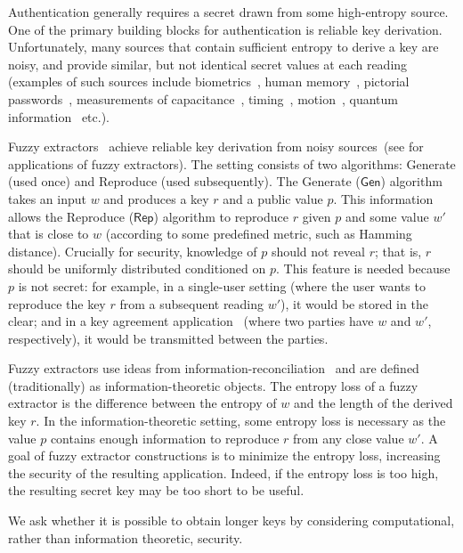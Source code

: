 \documentclass{llncs}
\newcommand{\class}[1]{{\ensuremath{\mathsf{#1}}}}
\newcommand{\gen}{\ensuremath{\class{Gen}}\xspace}
\newcommand{\rep}{\ensuremath{\class{Rep}}\xspace}
\begin{document}
Authentication generally requires a secret drawn from some high-entropy source.  One of the primary building blocks for authentication is reliable key derivation.  Unfortunately, many sources that contain sufficient entropy to derive a key are  noisy, and provide similar, but not identical secret values at each reading (examples of such sources include biometrics~\cite{daugman2004}, human memory~\cite{zviran1993comparison}, pictorial passwords~\cite{brostoff2000passfaces}, measurements of capacitance~\cite{tuyls2006puf}, timing~\cite{suh2007physical}, motion~\cite{castelluccia2005shake},  quantum information~\cite{bennett1988privacy} etc.).  

Fuzzy extractors~\cite{DBLP:journals/siamcomp/DodisORS08} achieve reliable key derivation from noisy sources~(see \cite{Boyen05secureremote,dodisWichs2009,chandran2010privacy} for applications of fuzzy extractors).  The setting 
consists of  two algorithms: Generate (used once) and Reproduce (used subsequently).  The Generate ($\gen$) algorithm takes an input $w$ and produces a key $r$ and a public value $p$.  This information allows
the Reproduce ($\rep$) algorithm to reproduce $r$ given $p$ and some value $w'$ that is close to $w$ (according to some predefined metric, such as Hamming distance). 
Crucially for security,  knowledge of $p$ should not reveal $r$; that is, $r$ should be uniformly distributed conditioned on $p$.  This feature is needed because $p$ is not secret: for example, in a single-user setting (where the user wants to reproduce the key $r$ from a subsequent reading $w'$), it would be stored in the clear; and in a key agreement application~\cite{Boyen05secureremote} (where two parties have $w$ and $w'$, respectively), it would be transmitted between the parties.

Fuzzy extractors use ideas from information-reconciliation~\cite{bennett1988privacy} and are defined (traditionally) as information-theoretic objects.  The entropy loss of a fuzzy extractor is the difference between the entropy of $w$ and the length of the derived key $r$.  In the information-theoretic setting, some entropy loss is necessary as the value $p$ contains enough information to reproduce $r$ from any close value $w'$. 
A goal of fuzzy extractor constructions is to minimize the entropy loss, increasing the security of the resulting application.  Indeed, if the entropy loss is too high, the resulting secret key may be too short to be useful. 

We ask whether it is possible to obtain longer keys by considering
computational, rather than information theoretic, security.
\end{document}
